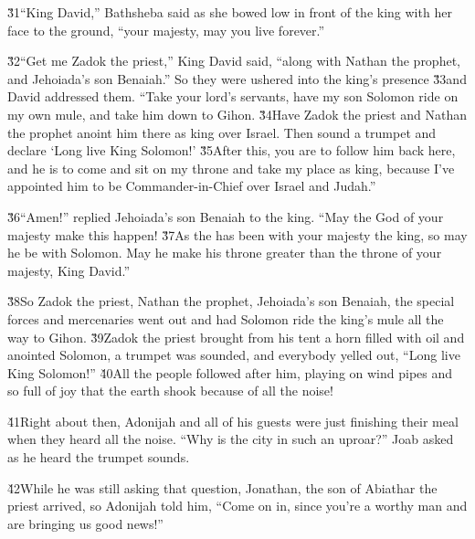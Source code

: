 \v{31}``King David,'' Bathsheba said as she bowed low in front of the king with her face to the ground, ``your majesty, may you live forever.''

\v{32}``Get me Zadok the priest,'' King David said, ``along with Nathan the prophet, and Jehoiada's son Benaiah.'' So they were ushered into the king's presence \v{33}and David addressed them. ``Take your lord's servants, have my son Solomon ride on my own mule, and take him down to Gihon. \v{34}Have Zadok the priest and Nathan the prophet anoint him there as king over Israel. Then sound a trumpet and declare `Long live King Solomon!' \v{35}After this, you are to follow him back here, and he is to come and sit on my throne and take my place as king, because I've appointed him to be Commander-in-Chief over Israel and Judah.''

\v{36}``Amen!'' replied Jehoiada's son Benaiah to the king. ``May the  God of your majesty make this happen! \v{37}As the  has been with your majesty the king, so may he be with Solomon. May he make his throne greater than the throne of your majesty, King David.''

\v{38}So Zadok the priest, Nathan the prophet, Jehoiada's son Benaiah, the special forces and mercenaries went out and had Solomon ride the king's mule all the way to Gihon. \v{39}Zadok the priest brought from his tent a horn filled with oil and anointed Solomon, a trumpet was sounded, and everybody yelled out, ``Long live King Solomon!'' \v{40}All the people followed after him, playing on wind pipes and so full of joy that the earth shook because of all the noise!

\v{41}Right about then, Adonijah and all of his guests were just finishing their meal when they heard all the noise. ``Why is the city in such an uproar?'' Joab asked as he heard the trumpet sounds.

\v{42}While he was still asking that question, Jonathan, the son of Abiathar the priest arrived, so Adonijah told him, ``Come on in, since you're a worthy man and are bringing us good news!''

